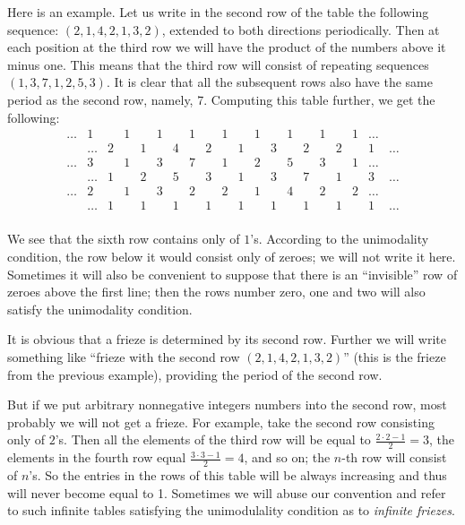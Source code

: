 \documentclass[a4paper,11pt]{amsart}
\theoremstyle{plain}
\theoremstyle{remark}
\theoremstyle{definition}
\numberwithin{equation}{section}
\numberwithin{figure}{section}
\begin{document}
Here is an example. Let us write in the second row of the table the following sequence: $(2,1,4,2,1,3,2)$, extended to both directions periodically. Then at each position at the third row we will have the product of the numbers above it minus one. This means that the third row will consist of repeating sequences $(1,3,7,1,2,5,3)$. It is clear that all the subsequent rows also have the same period as the second row, namely, 7. Computing this table further, we get the following:
\[
\begin{array}{ccccccccccccccccccccc}
\dots &1 && 1&& 1&& 1&& 1&& 1&& 1&& 1&& 1 &\dots\\
&\dots & 2 && 1 && 4 && 2 && 1 && 3 &&2 && 2 && 1& \dots\\
\dots &3 && 1&& 3&& 7&& 1&& 2&& 5&& 3&& 1 &\dots\\
&\dots & 1 && 2 && 5 && 3 && 1 && 3 &&7 && 1 && 3& \dots\\
\dots &2 && 1&& 3&& 2&& 2&& 1&& 4&& 2&& 2 &\dots\\
&\dots &1 && 1&& 1&& 1&& 1&& 1&& 1&& 1&& 1 &\dots\\
\end{array}
\]

We see that the sixth row contains only of $1$'s. According to the unimodality condition, the row below it would consist only of zeroes; we will not write it here. Sometimes it will also be convenient to suppose that there is an ``invisible'' row of zeroes above the first line; then the rows number zero, one and two will also satisfy the unimodality condition.


It is obvious that a frieze is determined by its second row. Further we will write something like ``frieze with the second row $(2,1,4,2,1,3,2)$'' (this is the frieze from the previous example), providing the period of the second row.

But if we put arbitrary nonnegative integers numbers into the second row, most probably we will not get a frieze. For example, take the second row consisting only of $2$'s. Then all the elements of the third row will be equal to $\frac{2\cdot 2-1}{2}=3$, the elements in the fourth row equal $\frac{3\cdot 3-1}{2}=4$, and so on; the $n$-th row will consist of $n$'s. So the entries in the rows of this table will be always increasing and thus will never become equal to 1. Sometimes we will abuse our convention and refer to such infinite tables satisfying the unimodulality condition as to \emph{infinite friezes}.
\end{document}
